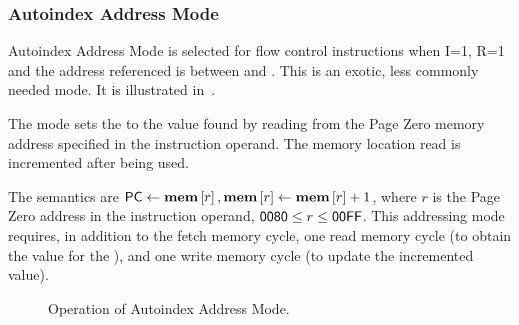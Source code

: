 






\subsubsection{Autoindex Address Mode}
\label{autoindex-address-mode}

Autoindex Address Mode is selected for flow control instructions when
I=1, R=1 and the address referenced is between  and
. This is an exotic, less commonly needed mode. It is
illustrated in~.

The mode sets the \PC to the value found by reading from the \gls{Page
  Zero} memory address specified in the instruction operand. The
memory location read is incremented after being used.

The semantics are $\mbox{\PC}\eq\mem{r}, \mem{r}\eq\mem{r}+1$, where
$r$ is the Page Zero address in the instruction operand,
$\mbox{\textsf{0080}}\leq r\leq \mbox{\textsf{00FF}}$. This addressing mode
requires, in addition to the fetch memory cycle, one read memory cycle
(to obtain the value for the \PC), and one write memory cycle (to
update the incremented value).

\begin{figure}[htb]
 \centering
\caption[Autoindex Address Mode]{\label{fig:autoindex-address-mode} Operation
  of Autoindex Address Mode.}
\end{figure}



